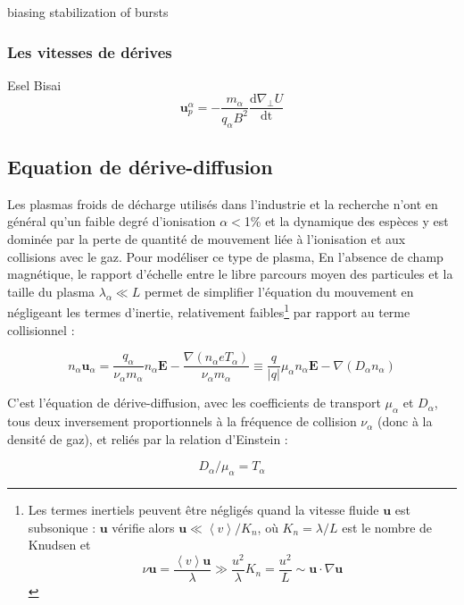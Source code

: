 \begin{refsection}
\parencite{Ghendrih}biasing stabilization of bursts
\subsubsection{Les vitesses de dérives}
\parencite{Garcia}Esel
\parencite{Bisai}Bisai
\label{vitessesDerive}
\begin{equation}
\label{1-vitessePol}
\mathbf{u}_p^\alpha=-\frac{m_\alpha}{q_\alpha B^2}\frac{\text{d}\nabla_\perp
U}{\text{dt}}
\end{equation}

\subsection{Equation de dérive-diffusion}
\label{1-transportAmbipolaire}
Les plasmas froids de décharge utilisés dans l'industrie et la recherche n'ont
en général qu'un faible degré d'ionisation $\alpha<$1\% et la dynamique des
espèces y est dominée par la perte de quantité de mouvement liée à l'ionisation
et aux collisions avec le gaz. Pour modéliser ce type de plasma, En l'absence de champ magnétique, le
rapport d'échelle entre le libre parcours moyen des particules et la taille du
plasma $\lambda_\alpha\ll L$ permet de simplifier l'équation du mouvement en
négligeant les termes d'inertie, relativement faibles\footnote{Les termes
inertiels peuvent être négligés quand la vitesse fluide $\mathbf u$ est
subsonique : $\mathbf u$ vérifie alors $\mathbf u\ll \left<v\right>/K_n$, où
$K_n=\lambda/L$ est le nombre de Knudsen et $$\nu \mathbf u=\frac{
\left<v\right>\mathbf u}{\lambda}\gg \frac{u^2}{\lambda}K_n=\frac{u^2}{L}\sim
\mathbf u\cdot\nabla\mathbf u$$} par rapport au terme collisionnel :

\begin{equation}
\label{1-eqDriftDif}
n_\alpha\mathbf u_\alpha=\frac{q_\alpha}{\nu_\alpha m_\alpha}n_\alpha\mathbf
E-\frac{\nabla\left(n_\alpha eT_\alpha\right)}{\nu_\alpha
m_\alpha}\equiv\frac{q}{|q|}\mu_\alpha n_\alpha\mathbf E-{\nabla\left(D_\alpha n_\alpha\right)}
\end{equation}

C'est l'équation de dérive-diffusion, avec les coefficients de
transport $\mu_\alpha$ et $D_\alpha$, tous deux
inversement proportionnels à la fréquence de collision $\nu_\alpha$ (donc à la
densité de gaz), et reliés par la relation d'Einstein :

\begin{equation}
\label{1-EinsteinRelation}
D_\alpha/\mu_\alpha=T_\alpha
\end{equation}


\end{refsection}
